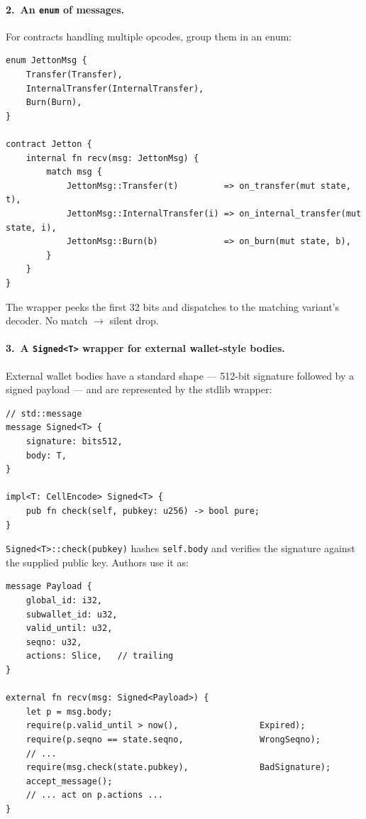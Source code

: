 \documentclass[12pt,oneside]{article}
\begin{document}
\paragraph{2.\ An \texttt{enum} of messages.}
For contracts handling multiple opcodes, group them in an enum:

\begin{verbatim}
enum JettonMsg {
    Transfer(Transfer),
    InternalTransfer(InternalTransfer),
    Burn(Burn),
}

contract Jetton {
    internal fn recv(msg: JettonMsg) {
        match msg {
            JettonMsg::Transfer(t)         => on_transfer(mut state, t),
            JettonMsg::InternalTransfer(i) => on_internal_transfer(mut state, i),
            JettonMsg::Burn(b)             => on_burn(mut state, b),
        }
    }
}
\end{verbatim}

The wrapper peeks the first 32 bits and dispatches to the matching
variant's decoder. No match $\to$ silent drop.

\paragraph{3.\ A \texttt{Signed<T>} wrapper for external wallet-style
bodies.}
\label{sec:signed-t}
External wallet bodies have a standard shape --- 512-bit signature
followed by a signed payload --- and are represented by the stdlib
wrapper:

\begin{verbatim}
// std::message
message Signed<T> {
    signature: bits512,
    body: T,
}

impl<T: CellEncode> Signed<T> {
    pub fn check(self, pubkey: u256) -> bool pure;
}
\end{verbatim}

\verb|Signed<T>::check(pubkey)| hashes \verb|self.body| and verifies
the signature against the supplied public key. Authors use it as:

\begin{verbatim}
message Payload {
    global_id: i32,
    subwallet_id: u32,
    valid_until: u32,
    seqno: u32,
    actions: Slice,   // trailing
}

external fn recv(msg: Signed<Payload>) {
    let p = msg.body;
    require(p.valid_until > now(),                Expired);
    require(p.seqno == state.seqno,               WrongSeqno);
    // ...
    require(msg.check(state.pubkey),              BadSignature);
    accept_message();
    // ... act on p.actions ...
}
\end{verbatim}
\end{document}
